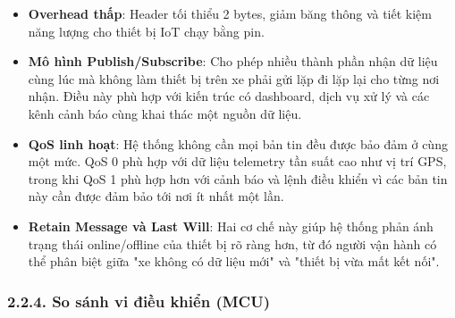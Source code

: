 \documentclass[a4paper]{extarticle}
\providecommand{\tightlist}{%
  \setlength{\itemsep}{0pt}\setlength{\parskip}{0pt}}
\begin{document}
\begin{itemize}
\tightlist
\item
  \textbf{Overhead thấp}: Header tối thiểu 2 bytes, giảm băng thông và
  tiết kiệm năng lượng cho thiết bị IoT chạy bằng pin.
\item
  \textbf{Mô hình Publish/Subscribe}: Cho phép nhiều thành phần nhận dữ
  liệu cùng lúc mà không làm thiết bị trên xe phải gửi lặp đi lặp lại
  cho từng nơi nhận. Điều này phù hợp với kiến trúc có dashboard, dịch
  vụ xử lý và các kênh cảnh báo cùng khai thác một nguồn dữ liệu.
\item
  \textbf{QoS linh hoạt}: Hệ thống không cần mọi bản tin đều được bảo
  đảm ở cùng một mức. QoS 0 phù hợp với dữ liệu telemetry tần suất cao
  như vị trí GPS, trong khi QoS 1 phù hợp hơn với cảnh báo và lệnh điều
  khiển vì các bản tin này cần được đảm bảo tới nơi ít nhất một lần.
\item
  \textbf{Retain Message và Last Will}: Hai cơ chế này giúp hệ thống
  phản ánh trạng thái online/offline của thiết bị rõ ràng hơn, từ đó
  người vận hành có thể phân biệt giữa "xe không có dữ liệu mới" và
  "thiết bị vừa mất kết nối".
\end{itemize}

\subsubsection{2.2.4. So sánh vi điều khiển
(MCU)}\label{224-so-suxe1nh-vi-ux111iux1ec1u-khiux1ec3n-mcu}
\end{document}
